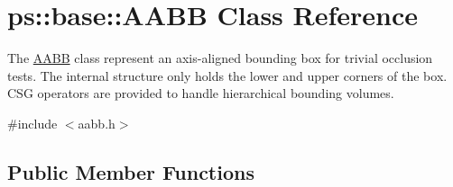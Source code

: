 \hypertarget{classps_1_1base_1_1AABB}{}\section{ps\+:\+:base\+:\+:A\+A\+B\+B Class Reference}
\label{classps_1_1base_1_1AABB}


The \hyperlink{classps_1_1base_1_1AABB}{A\+A\+B\+B} class represent an axis-\/aligned bounding box for trivial occlusion tests. The internal structure only holds the lower and upper corners of the box. C\+S\+G operators are provided to handle hierarchical bounding volumes.  




{\ttfamily \#include $<$aabb.\+h$>$}

\subsection*{Public Member Functions}
